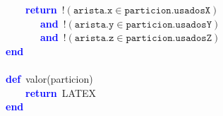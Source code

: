 \mbox{}\ \ \ \ \textbf{\textcolor{Blue}{return}}\ $\mathtt{!(arista.x \in particion.usadosX)}$ \\ %
\mbox{}\ \ \ \ \ \ \ \textbf{\textcolor{Blue}{and}}\ $\mathtt{!(arista.y \in particion.usadosY)}$ \\
\mbox{}\ \ \ \ \ \ \ \textbf{\textcolor{Blue}{and}}\ $\mathtt{!(arista.z \in particion.usadosZ)}$ \\
\mbox{}\textbf{\textcolor{Blue}{end}} \\
\mbox{} \\
\mbox{}\textbf{\textcolor{Blue}{def}}\ valor\textcolor{BrickRed}{(}particion\textcolor{BrickRed}{)} \\
\mbox{}\ \ \ \ \textbf{\textcolor{Blue}{return}}\ LATEX \\
\mbox{}\textbf{\textcolor{Blue}{end}} \\
\mbox{}
